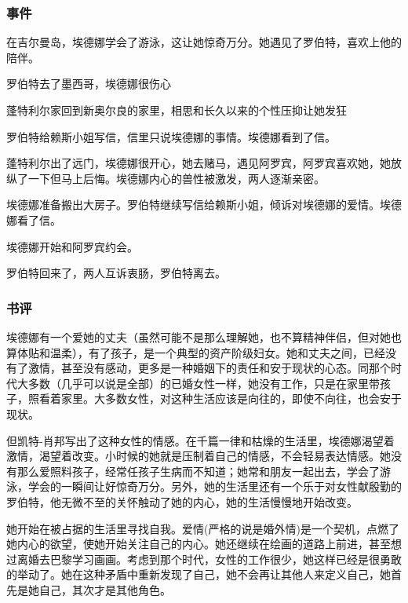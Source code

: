 \subsubsection{事件}
\begin{itemize*}
    \item 在吉尔曼岛，埃德娜学会了游泳，这让她惊奇万分。她遇见了罗伯特，喜欢上他的陪伴。
    \item 罗伯特去了墨西哥，埃德娜很伤心
    \item 蓬特利尔家回到新奥尔良的家里，相思和长久以来的个性压抑让她发狂
    \item 罗伯特给赖斯小姐写信，信里只说埃德娜的事情。埃德娜看到了信。
    \item 蓬特利尔出了远门，埃德娜很开心，她去赌马，遇见阿罗宾，阿罗宾喜欢她，她放纵了一下但马上后悔。埃德娜内心的兽性被激发，两人逐渐亲密。
    \item 埃德娜准备搬出大房子。罗伯特继续写信给赖斯小姐，倾诉对埃德娜的爱情。埃德娜看了信。
    \item 埃德娜开始和阿罗宾约会。
    \item 罗伯特回来了，两人互诉衷肠，罗伯特离去。
\end{itemize*}

\subsubsection{书评}

埃德娜有一个爱她的丈夫（虽然可能不是那么理解她，也不算精神伴侣，但对她也算体贴和温柔），有了孩子，是一个典型的资产阶级妇女。她和丈夫之间，已经没有了激情，甚至没有感动，更多是一种婚姻下的责任和安于现状的心态。同那个时代大多数（几乎可以说是全部）的已婚女性一样，她没有工作，只是在家里带孩子，照看着家里。大多数女性，对这种生活应该是向往的，即使不向往，也会安于现状。

但凯特-肖邦写出了这种女性的情感。在千篇一律和枯燥的生活里，埃德娜渴望着激情，渴望着改变。小时候的她就是压制着自己的情感，不会轻易表达情感。她没有那么爱照料孩子，经常任孩子生病而不知道；她常和朋友一起出去，学会了游泳，学会的一瞬间让好惊奇万分。另外，她的生活里还有一个乐于对女性献殷勤的罗伯特，他无微不至的关怀触动了她的内心，她的生活慢慢地开始改变。

她开始在被占据的生活里寻找自我。爱情(严格的说是婚外情)是一个契机，点燃了她内心的欲望，使她开始关注自己的内心。她还继续在绘画的道路上前进，甚至想过离婚去巴黎学习画画。考虑到那个时代，女性的工作很少，她这样已经是很勇敢的举动了。她在这种矛盾中重新发现了自己，她不会再让其他人来定义自己，她首先是她自己，其次才是其他角色。

